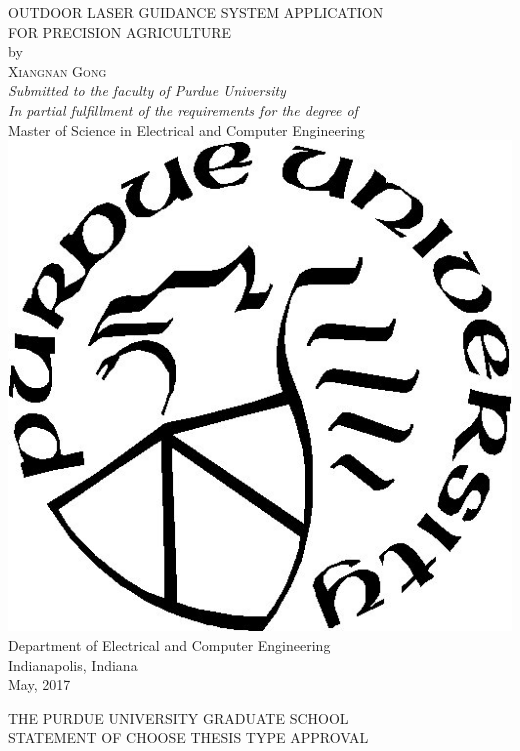 \documentclass[letterpaper,12pt,oneside]{book}
\begin{document}
	\frontmatter
	\thispagestyle{empty}
	\begin{center}
	\textsc{\Large OUTDOOR LASER GUIDANCE SYSTEM APPLICATION}\\
	\textsc{\Large FOR PRECISION AGRICULTURE}\\[5pt]
	{\large by}\\[5pt] 
	\textsc{\Large Xiangnan Gong}\\[10pt]
	\textit{\large Submitted to the faculty of Purdue University \\ 
	In partial fulfillment of the requirements for the degree of}\\[10pt] 
	
	\large Master of Science in Electrical and Computer Engineering\\[15pt]
		
	\includegraphics[scale = 0.7]{Purdue_logo.jpg}	\\[10pt]
	\large Department of Electrical and Computer Engineering\\[10pt]
	\large Indianapolis, Indiana\\[10pt]
	{\large May, 2017}
	\end{center}
	\newpage
	\begin{center}
		THE PURDUE UNIVERSITY GRADUATE SCHOOL \\
		STATEMENT OF CHOOSE THESIS TYPE APPROVAL\\[20pt]
	\end{center}
	
\end{document}
